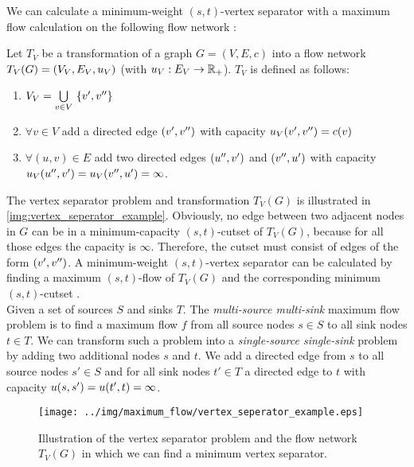 We can calculate a minimum-weight $(s,t)$-vertex separator with a maximum flow
calculation on the following flow network \cite{west2001introduction}:

\begin{definition}
\label{def:vertex_seperator_transformation}
Let $T_V$ be a transformation of a graph $G = (V,E,c)$ into 
a flow network $T_V(G) = (V_V, E_V, u_V)$ (with $u_V: E_V \rightarrow \mathbb{R}_+$). 
$T_V$ is defined as follows:
\begin{enumerate}
\item $V_V = \bigcup\limits_{v \in V}\ \{\incoming{v}, \outgoing{v}\}$
\item $\forall v \in V$ add a directed edge $(v',v'')$
      with capacity $u_V(v',v'') = c(v)$
\item $\forall (u,v) \in E$ add two directed edges $(u'', v')$ and 
      $(v'', u')$ with capacity $u_V(u'', v') = u_V(v'', u') = \infty$.
\end{enumerate} 
\end{definition}

The vertex separator problem and transformation $T_V(G)$ is illustrated in \autoref{img:vertex_seperator_example}.
Obviously, no edge between two adjacent nodes in $G$ can be in a minimum-capacity $(s,t)$-cutset of $T_V(G)$,
because for all those edges the capacity is $\infty$. Therefore, the cutset must consist
of edges of the form $(v',v'')$. A minimum-weight $(s,t)$-vertex separator can be calculated 
by finding a maximum $(s,t)$-flow of $T_V(G)$ and the corresponding minimum $(s,t)$-cutset \cite{menger1927allgemeinen}.\\
Given a set of sources $S$ and sinks $T$. The \emph{multi-source multi-sink} maximum flow problem is
to find a maximum flow $f$ from all source nodes $s \in S$ to all sink nodes $t \in T$.
We can transform such a problem into a \emph{single-source single-sink} problem by adding
two additional nodes $s$ and $t$. We add a directed edge from $s$ to all source nodes $s' \in S$ 
and for all sink nodes $t' \in T$ a directed edge to $t$ with capacity 
$u(s,s') = u(t',t) = \infty$.

\begin{figure}
\centering
\texttt{[image: ../img/maximum\_flow/vertex\_seperator\_example.eps]}
\caption{ Illustration of the vertex separator problem and the flow network $T_V(G)$ in which
          we can find a minimum vertex separator. }
\label{img:vertex_seperator_example}
\end{figure}

